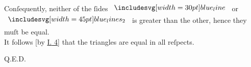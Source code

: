 \documentclass[11pt,preview]{standalone}
\begin{document}
\begin{center}
    Conſequently, neither of the ſides $\blueline$ or $\bimg{blue_lines_2}$ is greater than the other, hence they muſt be equal.\\ It follows [by \hyperref[book1pr4]{\textsc{I.} 4}] that the triangles are equal in all reſpects.
\end{center}

\hfill

\hfill Q.E.D.
\end{document}

